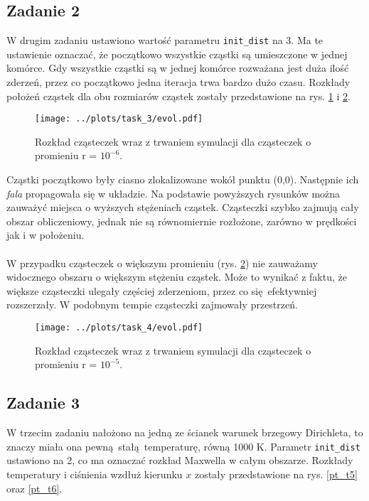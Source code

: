\documentclass[a4paper, 12pt]{article}
\begin{document}
	\newpage
	
	\subsection*{Zadanie 2}
	
	W drugim zadaniu ustawiono wartość parametru \texttt{init\_dist} na 3.
	Ma te ustawienie oznaczać, że początkowo wszystkie cząstki są umieszczone w jednej komórce.
	Gdy wszystkie cząstki są w jednej komórce rozważana jest duża ilość zderzeń, przez co początkowo jedna iteracja trwa bardzo dużo czasu. 
	Rozkłady położeń cząstek dla obu rozmiarów cząstek zostały przedstawione na rys. \ref{loc_task_3} i \ref{loc_task_4}.
	
	\begin{figure}[H]
		\centering
		\texttt{[image: ../plots/task\_3/evol.pdf]}
		\caption{Rozkład cząsteczek wraz z trwaniem symulacji dla cząsteczek o promieniu r = $10^{-6}$.}
		\label{loc_task_3}
	\end{figure}

	\noindent Cząstki początkowo były ciasno zlokalizowane wokół punktu (0,0).
	Następnie ich \textit{fala} propagowała się w układzie. 
	Na podstawie powyższych rysunków można zauważyć miejsca o wyższych stężeniach cząstek.
	Cząsteczki szybko zajmują cały obszar obliczeniowy, jednak nie są równomiernie rozłożone, zarówno w prędkości jak i w położeniu.
	\\
	\\
	W przypadku cząsteczek o większym promieniu (rys. \ref{loc_task_4}) nie zauważamy widocznego obszaru o większym stężeniu cząstek.
	Może to wynikać z faktu, że większe cząsteczki ulegały częściej zderzeniom, przez co się efektywniej rozszerzały.
	W podobnym tempie cząsteczki zajmowały przestrzeń. 
	\begin{figure}[H]
		\centering
		\texttt{[image: ../plots/task\_4/evol.pdf]}
		\caption{Rozkład cząsteczek wraz z trwaniem symulacji dla cząsteczek o promieniu r = $10^{-5}$.}
		\label{loc_task_4}
	\end{figure}
	
	\newpage
	
	\subsection*{Zadanie 3}
	
	W trzecim zadaniu nałożono na jedną ze ścianek warunek brzegowy Dirichleta, to znaczy miała ona pewną stałą temperaturę, równą 1000 K. 
	Parametr \texttt{init\_dist} ustawiono na 2, co ma oznaczać rozkład Maxwella w całym obszarze.
	Rozkłady temperatury i ciśnienia wzdłuż kierunku $x$ zostały przedstawione na rys. \ref{pt_t5} oraz \ref{pt_t6}.
	
\end{document}
